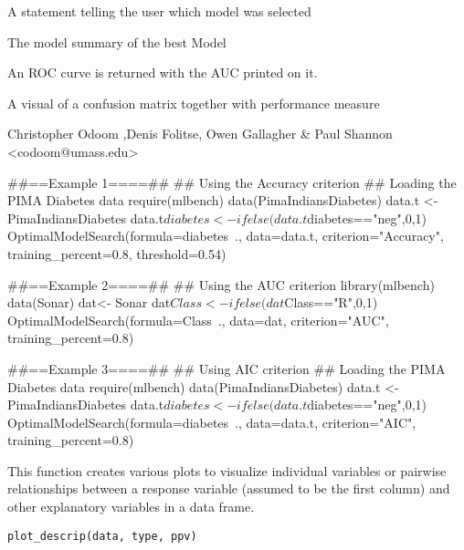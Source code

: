 \documentclass[a4paper]{book}
\begin{document}
%
\begin{Value}
\begin{ldescription}
\item[\code{Status}] A statement telling the user which model was selected
\item[\code{Best Model Output}] The model summary of the best Model
\item[\code{ROC plot}] An ROC curve is returned with the AUC printed on it.
\item[\code{Confusion Matrix}] A visual of a confusion matrix together with performance measure
\end{ldescription}
\end{Value}
%
\begin{Author}
Christopher Odoom ,Denis Folitse, Owen Gallagher \& Paul Shannon <codoom@umass.edu>
\end{Author}
%
\begin{Examples}
\begin{ExampleCode}

##==Example 1====##
## Using the Accuracy criterion
## Loading the PIMA Diabetes data
require(mlbench)
data(PimaIndiansDiabetes)
data.t <- PimaIndiansDiabetes
data.t$diabetes <-ifelse(data.t$diabetes=="neg",0,1)
OptimalModelSearch(formula=diabetes~., data=data.t,
criterion="Accuracy", training_percent=0.8, threshold=0.54)


##==Example 2====##
## Using the AUC criterion
library(mlbench)
data(Sonar)
dat<- Sonar
dat$Class <- ifelse(dat$Class=="R",0,1)
OptimalModelSearch(formula=Class~., data=dat,
criterion="AUC", training_percent=0.8)


##==Example 3====##
## Using AIC criterion
## Loading the PIMA Diabetes data
require(mlbench)
data(PimaIndiansDiabetes)
data.t <- PimaIndiansDiabetes
data.t$diabetes <-ifelse(data.t$diabetes=="neg",0,1)
OptimalModelSearch(formula=diabetes~., data=data.t,
criterion="AIC", training_percent=0.8)

\end{ExampleCode}
\end{Examples}
%
\begin{Description}
This function creates various plots to visualize individual variables or pairwise
relationships between a response variable (assumed to be the first column)
and other explanatory variables in a data frame.
\end{Description}
%
\begin{Usage}
\begin{verbatim}
plot_descrip(data, type, ppv)
\end{verbatim}
\end{Usage}
\end{document}
